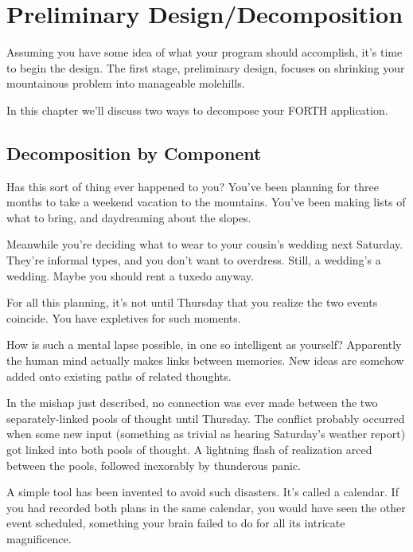 \chapter{Preliminary Design/\hy Decomposition}

Assuming you have some idea of what your program should accomplish,
it's time to begin the design. The first stage, preliminary design, focuses
on shrinking your mountainous problem into manageable molehills.

In this chapter we'll discuss two ways to decompose your FORTH
application.

\section{Decomposition by Component}

Has this sort of thing ever happened to you? You've been planning for
three months to take a weekend vacation to the mountains. You've been
making lists of what to bring, and daydreaming about the slopes.

Meanwhile you're deciding what to wear to your cousin's wedding
next Saturday. They're informal types, and you don't want to overdress.
Still, a wedding's a wedding. Maybe you should rent a tuxedo anyway.

For all this planning, it's not until Thursday that you realize the
two events coincide. You have expletives for such moments.

How is such a mental lapse possible, in one so intelligent as
yourself? Apparently the human mind actually makes links between
memories. New ideas are somehow added onto existing paths of related
thoughts.


In the mishap just described, no connection was ever made between the
two separately-linked pools of thought until Thursday.  The conflict
probably occurred when some new input (something as trivial as hearing
Saturday's weather report) got linked into both pools of thought. A
lightning flash of realization arced between the pools, followed
inexorably by thunderous panic.

A simple tool has been invented to avoid such disasters. It's called a
calendar. If you had recorded both plans in the same calendar, you would
have seen the other event scheduled, something your brain failed to do
for all its intricate magnificence.

